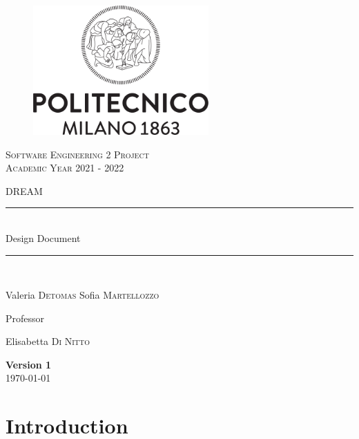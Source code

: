 \documentclass{article}
\begin{document}
\begin{titlepage}
      \centering
      \begin{figure}
            \begin{center}
                  \includegraphics[width=0.6\textwidth]{images/logo_polimi.png}
            \end{center}
      \end{figure}
      \vfill
      {\scshape\LARGE Software Engineering 2 Project\\Academic Year 2021 - 2022 \par}
      \vspace{0.8cm}
      {\scshape\LARGE DREAM}
      \vfill
      \newcommand{\HRule}{\rule{\linewidth}{0.3mm}}
      \centering
      \HRule \\[0.4cm]
      \huge  Design Document\\%
      \HRule \\
      \vspace{1cm}
      {\Large Valeria \textsc{Detomas} \quad Sofia \textsc{Martellozzo} \par}
      \vfill
      {\large Professor\par
          Elisabetta \textsc{Di Nitto}}
      \vfill
      {\large \textbf{Version 1}\\ \today \par}
\end{titlepage}


\newpage
\renewcommand\contentsname{Contents}
\tableofcontents

\newpage

\section{Introduction}


\newpage
\end{document}
